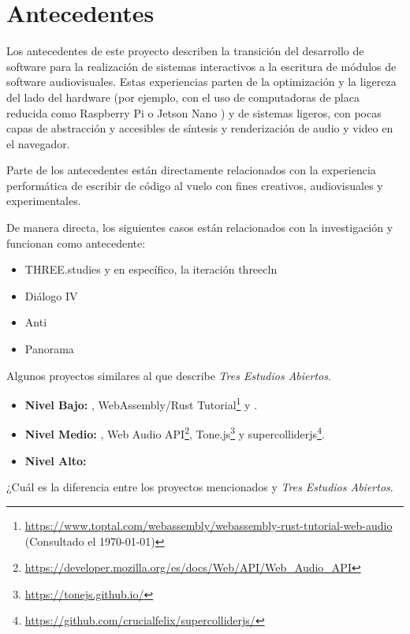 
\section*{Antecedentes}


Los antecedentes de este proyecto describen la transición del desarrollo de software para la realización de sistemas interactivos a la escritura de módulos de software audiovisuales. Estas experiencias parten de la optimización y la ligereza del lado del hardware (por ejemplo, con el uso de computadoras de placa reducida como Raspberry Pi o Jetson Nano ) y de sistemas ligeros, con pocas capas de abstracción y accesibles de síntesis y renderización de audio y video en el navegador.

Parte de los antecedentes están directamente relacionados con la experiencia performática de escribir de código al vuelo con fines creativos, audiovisuales y experimentales. 


De manera directa, los siguientes casos están relacionados con la investigación y funcionan como antecedente:

\begin{itemize}

\item THREE.studies \citep{threestudies} y en específico, la iteración threecln \citep{threecln}
\item Diálogo IV
\item Anti
\item Panorama 
  
\end{itemize}


Algunos proyectos similares al que describe \textit{Tres Estudios Abiertos}.

\begin{itemize}

\item \textbf{Nivel Bajo:} \citep{ruffbox}, WebAssembly/Rust Tutorial\footnote{\url{https://www.toptal.com/webassembly/webassembly-rust-tutorial-web-audio} (Consultado el \today)} y \citep{flocking}.
\item \textbf{Nivel Medio:} \citep{supercolliderweb}, Web Audio API\footnote{\url{https://developer.mozilla.org/es/docs/Web/API/Web_Audio_API}}, Tone.js\footnote{\url{https://tonejs.github.io/}} y supercolliderjs\footnote{\url{https://github.com/crucialfelix/supercolliderjs/}}.
\item \textbf{Nivel Alto:} \citep{estuary}
  
\end{itemize}

¿Cuál es la diferencia entre los proyectos mencionados y \textit{Tres Estudios Abiertos}. 

